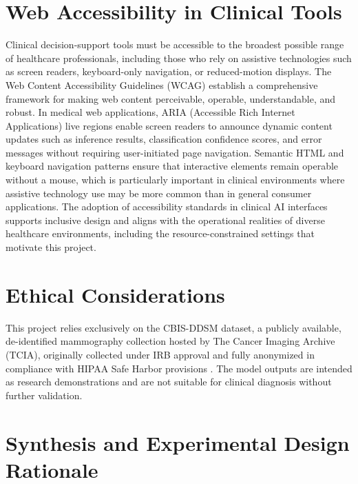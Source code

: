 \documentclass[justified,notoc,openany]{tufte-book}
\begin{document}
\section{Web Accessibility in Clinical Tools}\label{web-accessibility-in-clinical-tools}

Clinical decision-support tools must be accessible to the broadest possible range of healthcare professionals, including those who rely on assistive technologies such as screen readers, keyboard-only navigation, or reduced-motion displays. The Web Content Accessibility Guidelines (WCAG) \cite{W3C2018} establish a comprehensive framework for making web content perceivable, operable, understandable, and robust. In medical web applications, ARIA (Accessible Rich Internet Applications) live regions enable screen readers to announce dynamic content updates such as inference results, classification confidence scores, and error messages without requiring user-initiated page navigation. Semantic HTML and keyboard navigation patterns ensure that interactive elements remain operable without a mouse, which is particularly important in clinical environments where assistive technology use may be more common than in general consumer applications. The adoption of accessibility standards in clinical AI interfaces supports inclusive design and aligns with the operational realities of diverse healthcare environments, including the resource-constrained settings that motivate this project.

\section{Ethical Considerations}\label{ethical-considerations}

This project relies exclusively on the CBIS-DDSM dataset, a publicly available, de-identified mammography collection hosted by The Cancer Imaging Archive (TCIA), originally collected under IRB approval and fully anonymized in compliance with HIPAA Safe Harbor provisions \cite{Lee2017,Clark2013}. The model outputs are intended as research demonstrations and are not suitable for clinical diagnosis without further validation.

\section{Synthesis and Experimental Design Rationale}\label{synthesis-and-experimental-design-rationale}
\end{document}
